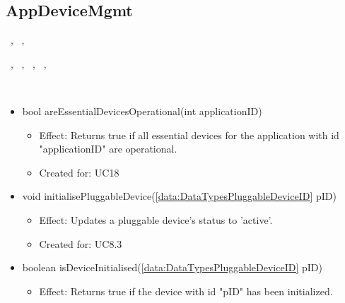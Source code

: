   \subsection{AppDeviceMgmt}\label{int:GatewayGatewayDeviceManagerAppDeviceMgmt}
    \begin{description}
      \item[Provided by:] \iconcomponent{}~, \iconcomponent{}~, \iconcomponent{}~
      \item[Required by:] \iconcomponent{}~, \iconcomponent{}~, \iconcomponent{}~, \iconcomponent{}~, \iconcomponent{}~
      \item[Operations:] ~
    \begin{itemize}[noitemsep,nolistsep,leftmargin=-.25cm]
      \item \textsf{bool areEssentialDevicesOperational(int applicationID)}
        \begin{itemize}[noitemsep,nolistsep]
           \item Effect: Returns true if all essential devices for the application with id "applicationID" are operational.
\item Created for: UC18
        \end{itemize}
      \item \textsf{void initialisePluggableDevice(\ref{data:DataTypesPluggableDeviceID} pID)}
        \begin{itemize}[noitemsep,nolistsep]
           \item Effect: Updates a pluggable device's status to 'active'.
\item Created for: UC8.3
        \end{itemize}
      \item \textsf{boolean isDeviceInitialised(\ref{data:DataTypesPluggableDeviceID} pID)}
        \begin{itemize}[noitemsep,nolistsep]
           \item Effect: Returns true if the device with id "pID" has been initialized.

\end{itemize}
\end{itemize}
\end{description}
